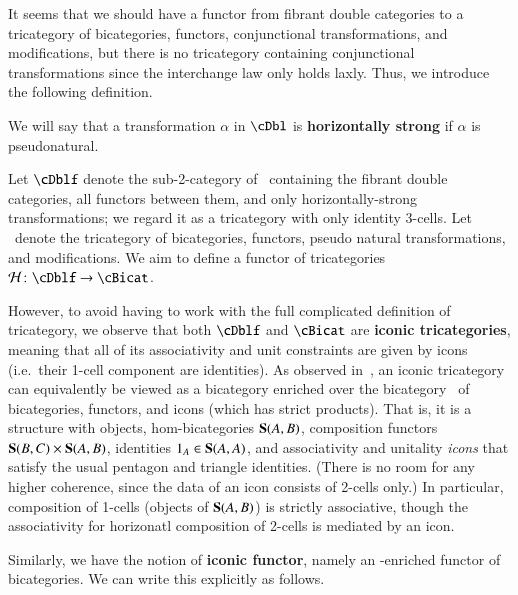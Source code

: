 


It seems that we should have a functor from fibrant double categories
to a tricategory of bicategories, functors, conjunctional
transformations, and modifications, but there is no tricategory
containing conjunctional transformations since the interchange law
only holds laxly.  Thus, we introduce the following definition.

\begin{defn}
  We will say that a transformation $\alpha$ in $\cDbl$ is \textbf{horizontally strong} if $\hat\alpha$ is pseudonatural.
\end{defn}

Let $\cDblf$
denote the sub-2-category of \cDbl\ containing the fibrant double
categories, all functors between them, and only horizontally-strong transformations; we regard it as a tricategory with only identity 3-cells.
Let \cBicat\ denote the tricategory of
bicategories, functors, pseudo natural transformations, and
modifications.  We aim to define a functor of tricategories $\cH\maps \cDblf\to \cBicat$.

However, to avoid having to work with the full complicated definition of tricategory, we observe that both $\cDblf$ and $\cBicat$ are \textbf{iconic tricategories}, meaning that all of its associativity and unit constraints are given by icons (i.e.\ their 1-cell component are identities).
As observed in~\cite{shulman:psalg}, an iconic tricategory can equivalently be viewed as a bicategory enriched over the bicategory \Icon\ of bicategories, functors, and icons (which has strict products).
That is, it is a structure \bS with objects, hom-bicategories $\mathbf{S}(A,B)$, composition functors $\mathbf{S}(B,C)\times \mathbf{S}(A,B)$, identities $1_A \in \mathbf{S}(A,A)$, and associativity and unitality \emph{icons} that satisfy the usual pentagon and triangle identities.
(There is no room for any higher coherence, since the data of an icon consists of 2-cells only.)
In particular, composition of 1-cells (objects of $\mathbf{S}(A,B)$) is strictly associative, though the associativity for horizonatl composition of 2-cells is mediated by an icon.

Similarly, we have the notion of \textbf{iconic functor}, namely an \Icon-enriched functor of bicategories.
We can write this explicitly as follows.

